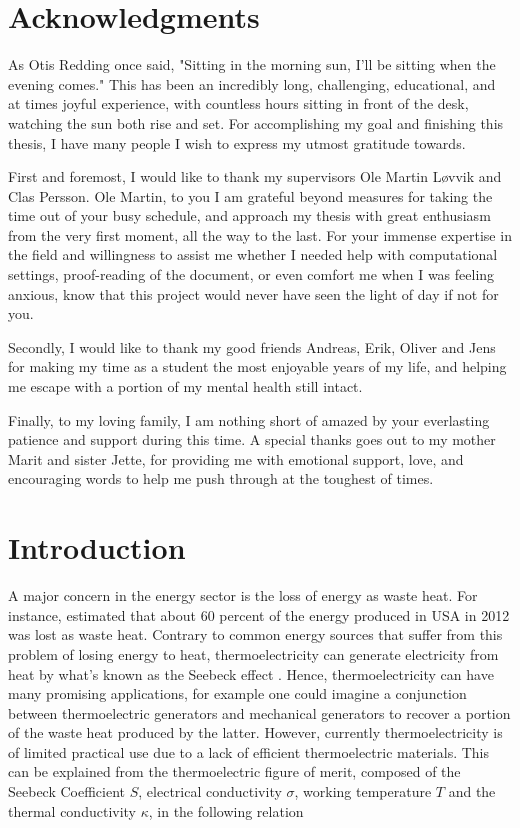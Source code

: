 \documentclass[UKenglish]{ifimaster}  %
\begin{document}
\chapter*{Acknowledgments}                  %
As Otis Redding once said, "Sitting in the morning sun, I'll be sitting when the evening comes." This has been an incredibly long, challenging, educational, and at times joyful experience, with countless hours sitting in front of the desk, watching the sun both rise and set. For accomplishing my goal and finishing this thesis, I have many people I wish to express my utmost gratitude towards.

First and foremost, I would like to thank my supervisors Ole Martin Løvvik and Clas Persson. Ole Martin, to you I am grateful beyond measures for taking the time out of your busy schedule, and approach my thesis with great enthusiasm from the very first moment, all the way to the last. For your immense expertise in the field and willingness to assist me whether I needed help with computational settings, proof-reading of the document, or even comfort me when I was feeling anxious, know that this project would never have seen the light of day if not for you.

Secondly, I would like to thank my good friends Andreas, Erik, Oliver and Jens for making my time as a student the most enjoyable years of my life, and helping me escape with a portion of my mental health still intact. 

Finally, to my loving family, I am nothing short of amazed by your everlasting patience and support during this time. A special thanks goes out to my mother Marit and sister Jette, for providing me with emotional support, love, and encouraging words to help me push through at the toughest of times.

\tableofcontents{}
\listoffigures{}
\listoftables{}

\mainmatter{}

\chapter{Introduction}                  %

A major concern in the energy sector is the loss of energy as waste heat. For instance, \cite{thermo} estimated that about 60 percent of the energy produced in USA in 2012 was lost as waste heat. Contrary to common energy sources that suffer from this problem of losing energy to heat, thermoelectricity can generate electricity from heat by what's known as the Seebeck effect \cite{wikipedia_thermoelectric_2020}. Hence, thermoelectricity can have many promising applications, for example one could imagine a conjunction between thermoelectric generators and mechanical generators to recover a portion of the waste heat produced by the latter. However, currently thermoelectricity is of limited practical use due to a lack of efficient thermoelectric materials.  This can be explained from the thermoelectric figure of merit, composed of the Seebeck Coefficient $S$, electrical conductivity $\sigma$, working temperature $T$ and the thermal conductivity $\kappa$, in the following relation \cite{bandgap2Dirac} 
\end{document}

